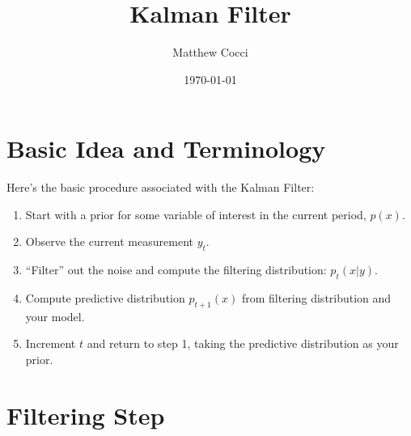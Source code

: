 \documentclass[a4paper,12pt]{article}
\author{Matthew Cocci}
\title{Kalman Filter}
\date{\today}
\begin{document}
\maketitle


\section{Basic Idea and Terminology}

Here's the basic procedure associated with the Kalman
Filter:
\begin{enumerate}
    \item Start with a prior for some variable of interest
	in the current period, $p(x)$.
    \item Observe the current measurement $y_t$.
    \item ``Filter'' out the noise and 
	compute the filtering distribution: $p_t(x | y)$.
    \item Compute predictive distribution $p_{t+1}(x)$
	from  filtering distribution and your model.
    \item Increment $t$ and return to step 1, taking
	the predictive distribution as your prior.

\end{enumerate}

\section{Filtering Step}
\end{document}
